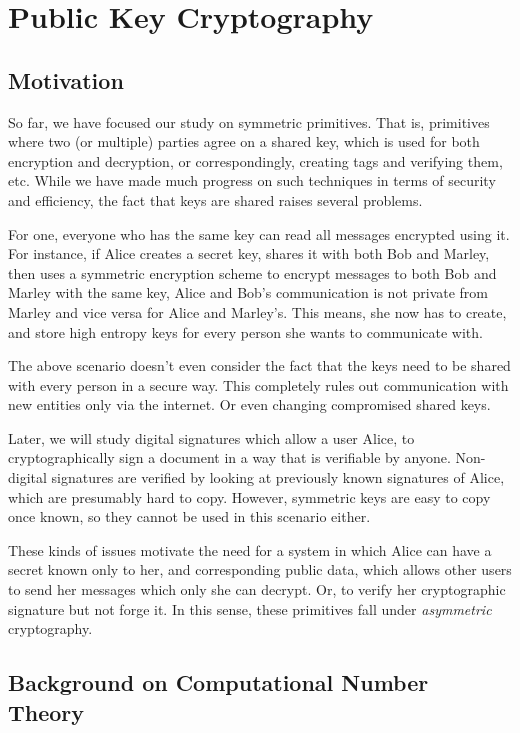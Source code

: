 \section{Public Key Cryptography}
\label{sec:pkc}



\subsection{Motivation}
So far, we have focused our study on symmetric primitives. That is, primitives where two (or multiple) parties agree on a shared key, which is used for both encryption and decryption, or correspondingly, creating tags and verifying them, etc. While we have made much progress on such techniques in terms of security and efficiency, the fact that keys are shared raises several problems. 

For one, everyone who has the same key can read all messages encrypted using it. For instance, if Alice creates a secret key, shares it with both Bob and Marley, then uses a symmetric encryption scheme to encrypt messages to both Bob and Marley with the same key, Alice and Bob's communication is not private from Marley and vice versa for Alice and Marley's. This means, she now has to create, and store high entropy keys for every person she wants to communicate with. 

The above scenario doesn't even consider the fact that the keys need to be shared with every person in a secure way. This completely rules out communication with new entities only via the internet. Or even changing compromised shared keys. 

Later, we will study digital signatures which allow a user Alice, to cryptographically sign a document in a way that is verifiable by anyone. Non-digital signatures are verified by looking at previously known signatures of Alice, which are presumably hard to copy. However, symmetric keys are easy to copy once known, so they cannot be used in this scenario either.

These kinds of issues motivate the need for a system in which Alice can have a secret known only to her, and corresponding public data, which allows other users to send her messages which only she can decrypt. Or, to verify her cryptographic signature but not forge it. In this sense, these primitives fall under \emph{asymmetric} cryptography. 

\subsection{Background on Computational Number Theory}
